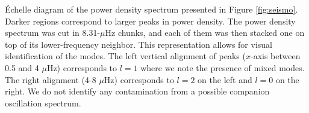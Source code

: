 \label{fig:echelle} \'Echelle diagram of the power density spectrum presented in Figure \ref{fig:seismo}. Darker regions correspond to larger peaks in power density. The power density spectrum was cut in 8.31-$\mu$Hz chunks, and each of them was then stacked one on top of its lower-frequency neighbor. This representation allows for visual identification of the modes. The left vertical alignment of peaks ($x$-axis between 0.5 and 4 $\mu$Hz) corresponds to $l=1$ where we note the presence of mixed modes. The right alignment (4-8 $\mu$Hz) corresponds to $l=2$ on the left and $l=0$ on the right. We do not identify any contamination from a possible companion oscillation spectrum.

  